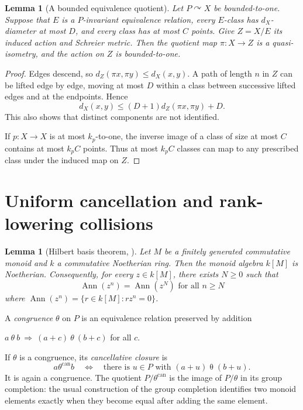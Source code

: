 \documentclass[11pt,letterpaper]{article}
\newtheorem{lemma}[theorem]{Lemma}
\theoremstyle{definition}
\newcommand{\act}{\curvearrowright}
\begin{document}
\begin{lemma}[A bounded equivalence quotient]\label{lem:quotient}
Let $P\act X$ be bounded-to-one. Suppose that $E$ is a $P$-invariant
equivalence relation, every $E$-class has $d_X$-diameter at most $D$, and
every class has at most $C$ points. Give $Z=X/E$ its induced action and
Schreier metric. Then the quotient map $\pi:X\to Z$ is a quasi-isometry,
and the action on $Z$ is bounded-to-one.
\end{lemma}

\begin{proof}
Edges descend, so $d_Z(\pi x,\pi y)\le d_X(x,y)$. A path of length $n$
in $Z$ can be lifted edge by edge, moving at most $D$ within a class
between successive lifted edges and at the endpoints. Hence
\begin{equation}\label{eq:quotient-metric}
 d_X(x,y)\le (D+1)d_Z(\pi x,\pi y)+D.
\end{equation}
This also shows that distinct components are not identified.

If $p:X\to X$ is at most $k_p$-to-one, the inverse image of a class of
size at most $C$ contains at most $k_pC$ points. Thus at most $k_pC$
classes can map to any prescribed class under the induced map on $Z$.
\end{proof}

\section{Uniform cancellation and rank-lowering collisions}\label{sec:cancellation}

\begin{lemma}[Hilbert basis theorem, \cite{Stacks}]\label{Hilbert basis theorem}
   Let $M$ be a finitely generated commutative monoid and $k$ a commutative Noetherian ring. Then the monoid algebra $k[M]$ is Noetherian. Consequently, for every $z\in k[M]$, there exists $N\geq 0$ such that
$$\operatorname{Ann}(z^n)=\operatorname{Ann}(z^N)\text{ for all }n\geq N$$
where $\operatorname{Ann}(z^n)=\{r\in k[M]:rz^n=0\}$.
\end{lemma}

A \emph{congruence} $\theta$ on $P$ is an equivalence relation preserved by addition \begin{center}$a\ \theta\ b\ \Longrightarrow\ (a+c)\ \theta\ (b+c)$ for all $c$.\end{center} If
$\theta$ is a congruence, its \emph{cancellative closure} is
\begin{equation}\label{eq:can}
 a\mathrel{\theta^{\mathrm{can}}}b
 \quad\Longleftrightarrow\quad
 \text{there is }u\in P\text{ with }(a+u)\mathrel\theta (b+u).
\end{equation}
It is again a congruence. The quotient $P/\theta^{\mathrm{can}}$ is the
image of $P/\theta$ in its group completion: the usual construction of the
group completion identifies two monoid elements exactly when they become
equal after adding the same element.
\end{document}
